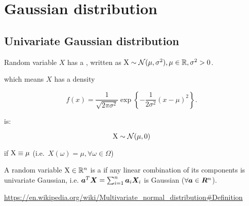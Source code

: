 \chapter{Gaussian distribution}


\section{Univariate Gaussian distribution}

\begin{defn}
Random variable $X$ has a , written as ${\textnormal{X}} \sim {\mathcal{N}}(\mu, \sigma^2), \mu \in {\mathbb{R}}, \sigma^2 > 0$.

which means $X$ has a density

\begin{equation}
    f(x) = \frac{1}{\sqrt{2 \pi \sigma^2}} \exp{ \left\{ -\frac{1}{2\sigma^2} (x - \mu)^2 \right\}}.
\end{equation}
\end{defn}

\begin{defn}
 is:

\begin{equation}
    {\textnormal{X}} \sim {\mathcal{N}}(\mu, 0)
\end{equation}

if ${\textnormal{X}} \equiv \mu$ (i.e.\ $X(\omega) = \mu, \forall \omega \in \Omega$)
\end{defn}

\begin{defn}
A random variable ${\textnormal{X}} \in {\mathbb{R}}^n$ is a  if any linear combination of its components is univariate Gaussian, i.e. ${\bm{a}}^T {\bm{X}} = \sum_{i=1}^n {\bm{a}}_i {\bm{X}}_i$ is Gaussian ($\forall {\bm{a}} \in {\bm{R}}^n$).

\url{https://en.wikipedia.org/wiki/Multivariate_normal_distribution#Definition}

\end{defn}


